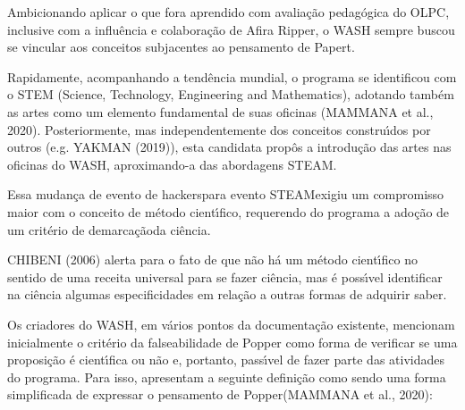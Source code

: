 \documentclass[
12pt,		%
openright,	%
twoside,  %
a4paper,			%
chapter=TITLE,		%
english,			%
french,				%
spanish,			%
brazil				%
]{USPSC-classe/USPSC}
\begin{document}
\noindent\begin{center}\mbox{\centering{}}\end{center}


Ambicionando aplicar o que fora aprendido com avalia\c{c}\~ao pedag\'ogica do OLPC, inclusive com a influ\^encia e colabora\c{c}\~ao de Afira Ripper, o WASH sempre buscou se vincular aos conceitos subjacentes ao pensamento de Papert.




Rapidamente, acompanhando a tend\^encia mundial, o programa se identificou com o STEM (Science, Technology, Engineering and Mathematics), adotando tamb\'em as artes como um elemento fundamental de suas oficinas  (MAMMANA et al., 2020). Posteriormente, mas independentemente dos conceitos constru\'{\i}dos por outros (e.g.  YAKMAN (2019)), esta candidata prop\^os a introdu\c{c}\~ao das artes nas oficinas do WASH, aproximando-a das abordagens STEAM.




Essa mudan\c{c}a de \textquotedbl evento de hackers\textquotedbl  para \textquotedbl evento STEAM\textquotedbl  exigiu um compromisso maior com o conceito de m\'etodo cient\'{\i}fico, requerendo do programa a ado\c{c}\~ao de um \textquotedbl crit\'erio de demarca\c{c}\~ao\textquotedbl  da ci\^encia.




 CHIBENI (2006) alerta para o fato de que \textquotedbl n\~ao h\'a um m\'etodo cient\'{\i}fico no sentido de uma receita universal para se fazer ci\^encia\textquotedbl , mas \'e poss\'{\i}vel identificar na ci\^encia algumas especificidades em rela\c{c}\~ao a outras formas de adquirir saber.




Os criadores do WASH, em v\'arios pontos da documenta\c{c}\~ao existente, mencionam inicialmente o crit\'erio da falseabilidade de Popper como forma de verificar se uma proposi\c{c}\~ao \'e cient\'{\i}fica ou n\~ao e, portanto, pass\'{\i}vel de fazer parte das atividades do programa. Para isso, apresentam a seguinte defini\c{c}\~ao como sendo uma \textquotedbl forma simplificada de expressar o pensamento de Popper\textquotedbl   (MAMMANA et al., 2020):
\end{document}
